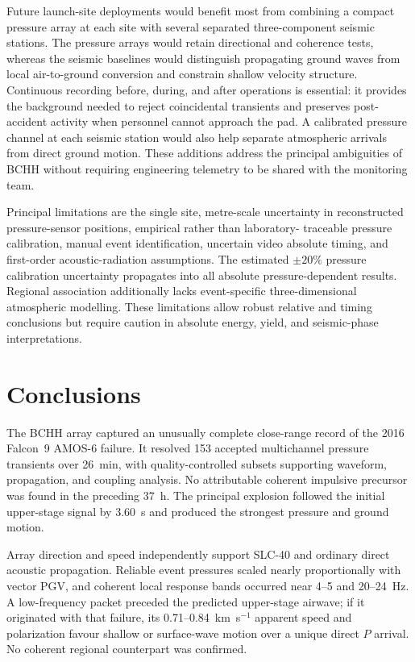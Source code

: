 \documentclass[]{seismica}
\begin{document}
Future launch-site deployments would benefit most from combining a compact
pressure array at each site with several separated three-component seismic
stations. The pressure arrays would retain directional and coherence tests,
whereas the seismic baselines would distinguish propagating ground waves from
local air-to-ground conversion and constrain shallow velocity structure.
Continuous recording before, during, and after operations is essential: it
provides the background needed to reject coincidental transients and preserves
post-accident activity when personnel cannot approach the pad. A calibrated
pressure channel at each seismic station would also help separate atmospheric
arrivals from direct ground motion. These additions address the principal
ambiguities of BCHH without requiring engineering telemetry to be shared with
the monitoring team.

Principal limitations are the single site, metre-scale uncertainty in
reconstructed pressure-sensor positions, empirical rather than laboratory-
traceable pressure calibration, manual event identification, uncertain video
absolute timing, and first-order acoustic-radiation assumptions. The estimated
$\pm20\%$ pressure calibration uncertainty propagates into all absolute
pressure-dependent results. Regional association additionally lacks
event-specific three-dimensional atmospheric modelling. These limitations
allow robust relative and timing conclusions but require caution in absolute
energy, yield, and seismic-phase interpretations.

\section{Conclusions}
\label{sec:conclusions}

The BCHH array captured an unusually complete close-range record of the 2016
Falcon~9 AMOS-6 failure. It resolved 153 accepted multichannel pressure
transients over 26~min, with quality-controlled subsets supporting waveform,
propagation, and coupling analysis. No attributable coherent impulsive
precursor was found in the preceding 37~h. The principal explosion followed
the initial upper-stage signal by 3.60~s and produced the strongest pressure
and ground motion.

Array direction and speed independently support SLC-40 and ordinary direct
acoustic propagation. Reliable event pressures scaled nearly proportionally
with vector PGV, and coherent local response bands occurred near 4--5 and
20--24~Hz. A low-frequency packet preceded the predicted upper-stage airwave;
if it originated with that failure, its 0.71--0.84~km~s$^{-1}$ apparent speed
and polarization favour shallow or surface-wave motion over a unique direct
$P$ arrival. No coherent regional counterpart was confirmed.
\end{document}
